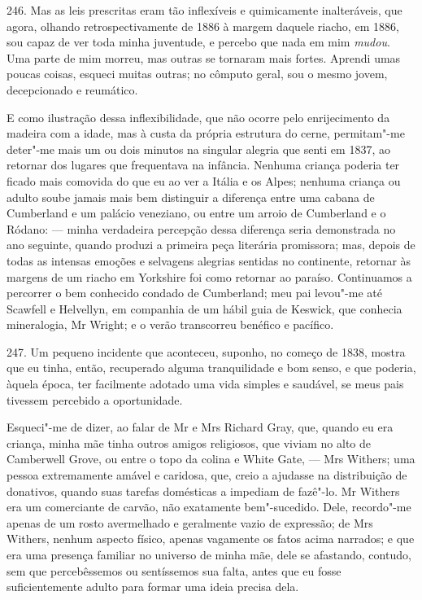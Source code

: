 246. Mas as leis prescritas eram tão inflexíveis e quimicamente
inalteráveis, que agora, olhando retrospectivamente de 1886 à margem
daquele riacho, em 1886, sou capaz de ver toda minha juventude, e
percebo que nada em mim \emph{mudou}. Uma parte de mim morreu, mas
outras se tornaram mais fortes. Aprendi umas poucas coisas, esqueci
muitas outras; no cômputo geral, sou o mesmo jovem, decepcionado e
reumático.

E como ilustração dessa inflexibilidade, que não ocorre pelo
enrijecimento da madeira com a idade, mas à custa da própria estrutura
do cerne, permitam"-me deter"-me mais um ou dois minutos na singular
alegria que senti em 1837, ao retornar dos lugares que frequentava na
infância. Nenhuma criança poderia ter ficado mais comovida do que eu ao
ver a Itália e os Alpes; nenhuma criança ou adulto soube jamais mais bem
distinguir a diferença entre uma cabana de Cumberland e um palácio
veneziano, ou entre um arroio de Cumberland e o Ródano: --- minha
verdadeira percepção dessa diferença seria demonstrada no ano seguinte,
quando produzi a primeira peça literária promissora; mas, depois de
todas as intensas emoções e selvagens alegrias sentidas no continente,
retornar às margens de um riacho em Yorkshire foi como retornar ao
paraíso. Continuamos a percorrer o bem conhecido condado de Cumberland;
meu pai levou"-me até Scawfell e Helvellyn, em companhia de um hábil guia
de Keswick, que conhecia mineralogia, Mr Wright; e o verão transcorreu
benéfico e pacífico.

247. Um pequeno incidente que aconteceu, suponho, no começo de 1838,
mostra que eu tinha, então, recuperado alguma tranquilidade e bom senso,
e que poderia, àquela época, ter facilmente adotado uma vida simples e
saudável, se meus pais tivessem percebido a oportunidade.

Esqueci"-me de dizer, ao falar de Mr e Mrs Richard Gray, que, quando eu
era criança, minha mãe tinha outros amigos religiosos, que viviam no
alto de Camberwell Grove, ou entre o topo da colina e White Gate, --- Mrs
Withers; uma pessoa extremamente amável e caridosa, que, creio a
ajudasse na distribuição de donativos, quando suas tarefas domésticas a
impediam de fazê"-lo. Mr Withers era um comerciante de carvão, não
exatamente bem"-sucedido. Dele, recordo"-me apenas de um rosto avermelhado
e geralmente vazio de expressão; de Mrs Withers, nenhum aspecto físico,
apenas vagamente os fatos acima narrados; e que era uma presença
familiar no universo de minha mãe, dele se afastando, contudo, sem que
percebêssemos ou sentíssemos sua falta, antes que eu fosse
suficientemente adulto para formar uma ideia precisa dela.

